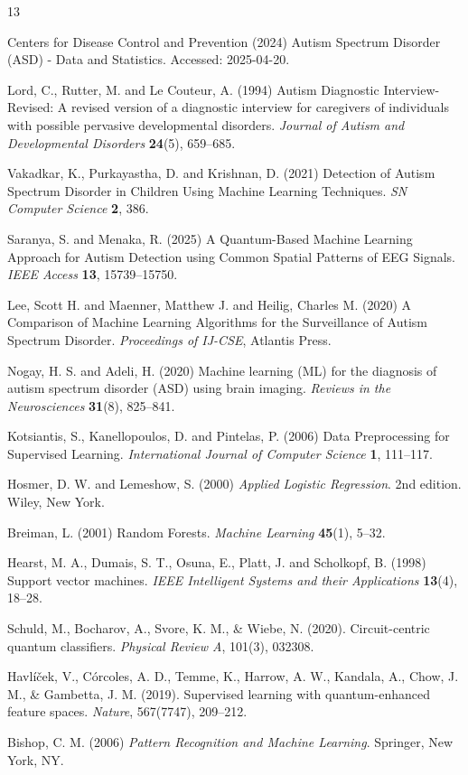 \documentclass[runningheads]{llncs}
\begin{document}
\begin{thebibliography}{13}

Centers for Disease Control and Prevention (2024) Autism Spectrum Disorder (ASD) - Data and Statistics. Accessed: 2025-04-20.


Lord, C., Rutter, M. and Le Couteur, A. (1994) Autism Diagnostic Interview-Revised: A revised version of a diagnostic interview for caregivers of individuals with possible pervasive developmental disorders. \emph{Journal of Autism and Developmental Disorders} \textbf{24}(5), 659--685.


Vakadkar, K., Purkayastha, D. and Krishnan, D. (2021) Detection of Autism Spectrum Disorder in Children Using Machine Learning Techniques. \emph{SN Computer Science} \textbf{2}, 386.

Saranya, S. and Menaka, R. (2025) A Quantum-Based Machine Learning Approach for Autism Detection using Common Spatial Patterns of EEG Signals. \emph{IEEE Access} \textbf{13}, 15739--15750.

Lee, Scott H. and Maenner, Matthew J. and Heilig, Charles M. (2020) A Comparison of Machine Learning Algorithms for the Surveillance of Autism Spectrum Disorder. \emph{Proceedings of IJ-CSE}, Atlantis Press.



Nogay, H. S. and Adeli, H. (2020) Machine learning (ML) for the diagnosis of autism spectrum disorder (ASD) using brain imaging. \emph{Reviews in the Neurosciences} \textbf{31}(8), 825--841.


Kotsiantis, S., Kanellopoulos, D. and Pintelas, P. (2006) Data Preprocessing for Supervised Learning. \emph{International Journal of Computer Science} \textbf{1}, 111--117.

Hosmer, D. W. and Lemeshow, S. (2000) \emph{Applied Logistic Regression}. 2nd edition. Wiley, New York.

Breiman, L. (2001) Random Forests. \emph{Machine Learning} \textbf{45}(1), 5--32.


Hearst, M. A., Dumais, S. T., Osuna, E., Platt, J. and Scholkopf, B. (1998) Support vector machines. \emph{IEEE Intelligent Systems and their Applications} \textbf{13}(4), 18--28.

Schuld, M., Bocharov, A., Svore, K. M., \& Wiebe, N. (2020). Circuit-centric quantum classifiers. \emph{Physical Review A}, 101(3), 032308.

Havl\'{i}\v{c}ek, V., C\'{o}rcoles, A. D., Temme, K., Harrow, A. W., Kandala, A., Chow, J. M., \& Gambetta, J. M. (2019). Supervised learning with quantum-enhanced feature spaces. \emph{Nature}, 567(7747), 209--212.


Bishop, C. M. (2006) \emph{Pattern Recognition and Machine Learning}. Springer, New York, NY.


\end{thebibliography}
\end{document}
